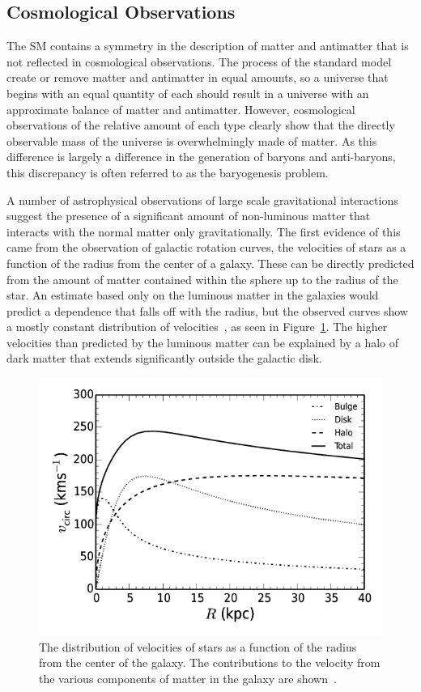 \subsection{Cosmological Observations}

The \ac{SM} contains a symmetry in the description of matter and antimatter that is not reflected in cosmological observations.
The process of the standard model create or remove matter and antimatter in equal amounts, so a universe that begins with an equal quantity of each should result in a universe with an approximate balance of matter and antimatter.
However, cosmological observations of the relative amount of each type clearly show that the directly observable mass of the universe is overwhelmingly made of matter.
As this difference is largely a difference in the generation of baryons and anti-baryons, this discrepancy is often referred to as the baryogenesis problem.

A number of astrophysical observations of large scale gravitational interactions suggest the presence of a significant amount of non-luminous matter that interacts with the normal matter only gravitationally.
The first evidence of this came from the observation of galactic rotation curves, the velocities of stars as a function of the radius from the center of a galaxy.
These can be directly predicted from the amount of matter contained within the sphere up to the radius of the star.
An estimate based only on the luminous matter in the galaxies would predict a dependence that falls off with the radius, but the observed curves show a mostly constant distribution of velocities~\cite{rotation_curves}, as seen in Figure~\ref{fig:rotational_curve}.
The higher velocities than predicted by the luminous matter can be explained by a halo of dark matter that extends significantly outside the galactic disk.

\begin{figure}
\includegraphics[width=\fullfig]{figures/rotation_curves.png}
\caption{The distribution of velocities of stars as a function of the radius from the center of the galaxy. The contributions to the velocity from the various components of matter in the galaxy are shown~\cite{rotation_curves}.}
\label{fig:rotational_curve}
\end{figure}

